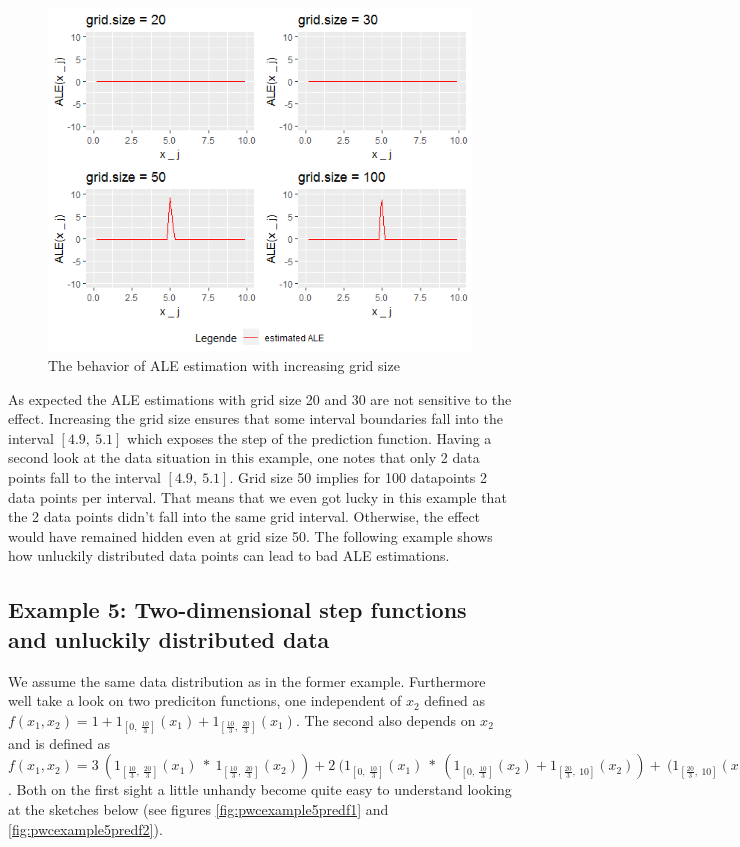 \documentclass[]{krantz}
\begin{document}
\begin{figure}
\includegraphics[width=1\linewidth]{images/ALE_2_pwc_example4_4plots_} \caption{The behavior of ALE estimation with increasing
grid size}\label{fig:pwcexample44plots}
\end{figure}




As expected the ALE estimations with grid size 20 and 30 are not
sensitive to the effect. Increasing the grid size ensures that some
interval boundaries fall into the interval \([4.9, ~5.1]\) which exposes
the step of the prediction function. Having a second look at the data
situation in this example, one notes that only 2 data points fall to the
interval \([4.9, ~5.1]\). Grid size 50 implies for 100 datapoints 2 data
points per interval. That means that we even got lucky in this example
that the 2 data points didn't fall into the same grid interval.
Otherwise, the effect would have remained hidden even at grid size 50.
The following example shows how unluckily distributed data points can
lead to bad ALE estimations.

\subsection{Example 5: Two-dimensional step functions and unluckily
distributed
data}\label{example-5-two-dimensional-step-functions-and-unluckily-distributed-data}

We assume the same data distribution as in the former example.
Furthermore well take a look on two prediciton functions, one
independent of \(x_2\) defined as
\(f(x_1, x_2) = 1 + 1_{[0,~\frac{10}{3}]}(x_1)+ 1_{[\frac{10}{3},~\frac{20}{3}]}(x_1)\).
The second also depends on \(x_2\) and is defined as
\(f(x_1, x_2) = 3~(1_{[\frac{10}{3},~\frac{20}{3}]}(x_1)~*~1_{[\frac{10}{3},~\frac{20}{3}]}(x_2)) + 2~(1_{[0,~\frac{10}{3}]}(x_1)~*~(1_{[0,~\frac{10}{3}]}(x_2)+1_{[\frac{20}{3}, ~10]}(x_2)) + ~(1_{[\frac{20}{3},~10]}(x_1)~*~(1_{[0,~\frac{10}{3}]}(x_2)+1_{[\frac{20}{3}, ~10]}(x_2))\)
. Both on the first sight a little unhandy become quite easy to
understand looking at the sketches below (see figures
\ref{fig:pwcexample5predf1} and \ref{fig:pwcexample5predf2}).
\end{document}
